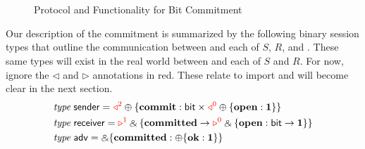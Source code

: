 \begin{figure*}
\centering
\begin{subfigure}{.4\textwidth}

\end{subfigure}%
\hspace{2em}
\begin{subfigure}{.5\textwidth}

\end{subfigure}%
\\[3ex]
\begin{subfigure}{\linewidth}

\end{subfigure}
\\[3ex]
\begin{subfigure}{\linewidth}

\end{subfigure}
\caption{Protocol and Functionality for Bit Commitment}
\label{fig:fcom}
\end{figure*}

Our description of the commitment is summarized by the following binary session types that
outline the communication between \Fcom and each of $S$, $R$, and \A.
These same types will exist in the real world between \Z and each of $S$ and $R$.
For now, ignore the $\triangleleft$ and $\triangleright$ annotations in red.
These relate to import and will become clear in the next section.
\begin{align*}
  &\relax{\it type} \; \mathsf{sender} = \textcolor{red}{\triangleleft^2} \oplus \{ \mathbf{commit} : \mathsf{bit} \times \textcolor{red}{\triangleleft^0} \oplus \{ \mathbf{open} : \mathbf{1} \} \} \\
  &\relax{\it type} \; \mathsf{receiver} = \textcolor{red}{\triangleright^1} \mathbin{\binampersand} \{ \mathbf{committed} \rightarrow \textcolor{red}{\triangleright^0} \mathbin{\binampersand} \{ \mathbf{open}: \mathsf{bit} \rightarrow \mathbf{1} \} \} \\
  &\relax{\it type} \; \mathsf{adv} = \mathbin{\binampersand} \{ \mathbf{committed}: \oplus \{ \mathbf{ok}: \mathbf{1} \} \}
\end{align*}

